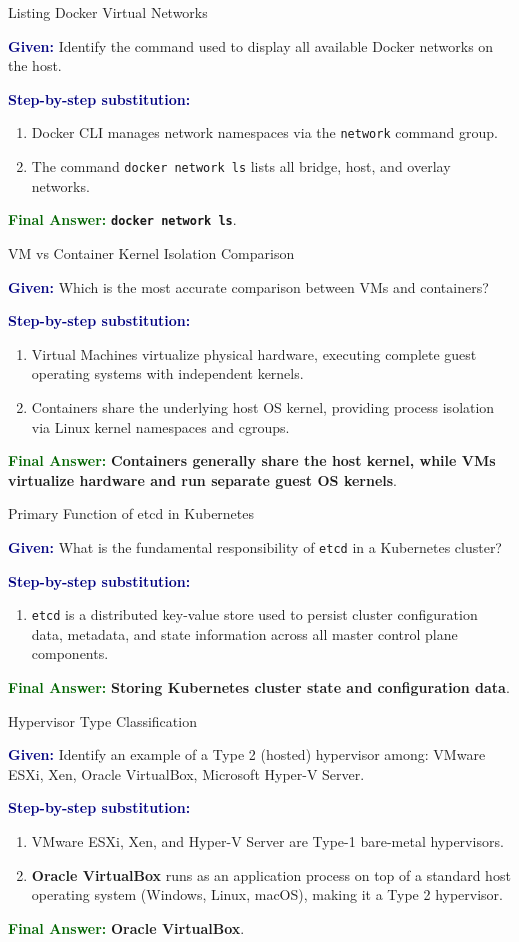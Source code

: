 \documentclass[11pt,a4paper,openany]{report}
\newcommand{\Given}{\par\textbf{\textcolor{navy}{Given:}} }
\newcommand{\Steps}{\par\textbf{\textcolor{navy}{Step-by-step substitution:}}\par}
\newcommand{\Answer}{\par\textbf{\textcolor{darkgreen}{Final Answer:}} }
\begin{document}
\begin{solved}{Listing Docker Virtual Networks}
\Given Identify the command used to display all available Docker networks on the host.
\Steps
\begin{enumerate}[leftmargin=*]
  \item Docker CLI manages network namespaces via the \texttt{network} command group.
  \item The command \texttt{docker network ls} lists all bridge, host, and overlay networks.
\end{enumerate}
\Answer \textbf{\texttt{docker network ls}}.
\end{solved}

\begin{solved}{VM vs Container Kernel Isolation Comparison}
\Given Which is the most accurate comparison between VMs and containers?
\Steps
\begin{enumerate}[leftmargin=*]
  \item Virtual Machines virtualize physical hardware, executing complete guest operating systems with independent kernels.
  \item Containers share the underlying host OS kernel, providing process isolation via Linux kernel namespaces and cgroups.
\end{enumerate}
\Answer \textbf{Containers generally share the host kernel, while VMs virtualize hardware and run separate guest OS kernels}.
\end{solved}

\begin{solved}{Primary Function of etcd in Kubernetes}
\Given What is the fundamental responsibility of \texttt{etcd} in a Kubernetes cluster?
\Steps
\begin{enumerate}[leftmargin=*]
  \item \texttt{etcd} is a distributed key-value store used to persist cluster configuration data, metadata, and state information across all master control plane components.
\end{enumerate}
\Answer \textbf{Storing Kubernetes cluster state and configuration data}.
\end{solved}

\begin{solved}{Hypervisor Type Classification}
\Given Identify an example of a Type 2 (hosted) hypervisor among: VMware ESXi, Xen, Oracle VirtualBox, Microsoft Hyper-V Server.
\Steps
\begin{enumerate}[leftmargin=*]
  \item VMware ESXi, Xen, and Hyper-V Server are Type-1 bare-metal hypervisors.
  \item \textbf{Oracle VirtualBox} runs as an application process on top of a standard host operating system (Windows, Linux, macOS), making it a Type 2 hypervisor.
\end{enumerate}
\Answer \textbf{Oracle VirtualBox}.
\end{solved}
\end{document}
